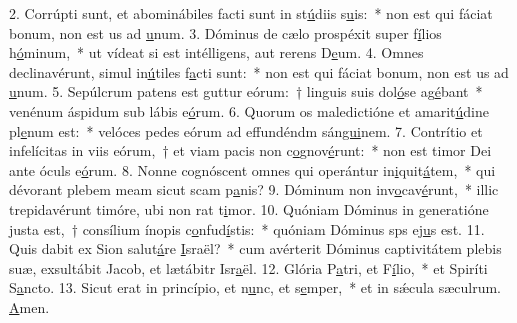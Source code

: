2. Corrúpti sunt, et abominábiles facti sunt in st\uline{ú}diis s\uline{u}is:~* non est qui fáciat bonum, non est us ad \uline{u}num.
3. Dóminus de cælo prospéxit super f\uline{í}lios h\uline{ó}minum,~* ut vídeat si est intélligens, aut rerens D\uline{e}um.
4. Omnes declinavérunt, simul in\uline{ú}tiles f\uline{a}cti sunt:~* non est qui fáciat bonum, non est us ad \uline{u}num.
5. Sepúlcrum patens est guttur eórum:~† linguis suis dol\uline{ó}se ag\uline{é}bant~* venénum áspidum sub lábis e\uline{ó}rum.
6. Quorum os maledictióne et amarit\uline{ú}dine pl\uline{e}num est:~* velóces pedes eórum ad effundéndm sán\uline{gui}nem.
7. Contrítio et infelícitas in viis eórum,~† et viam pacis non c\uline{o}gnov\uline{é}runt:~* non est timor Dei ante óculs e\uline{ó}rum.
8. Nonne cognóscent omnes qui operántur in\uline{i}quit\uline{á}tem,~* qui dévorant plebem meam sicut scam p\uline{a}nis?
9. Dóminum non inv\uline{o}cav\uline{é}runt,~* illic trepidavérunt timóre, ubi non rat t\uline{i}mor.
10. Quóniam Dóminus in generatióne justa est,~† consílium ínopis c\uline{o}nfud\uline{í}stis:~* quóniam Dóminus sps ej\uline{u}s est.
11. Quis dabit ex Sion salut\uline{á}re \uline{I}sraël?~* cum avérterit Dóminus captivitátem plebis suæ, exsultábit Jacob, et lætábitr Isr\uline{a}ël.
12. Glória P\uline{a}tri, et F\uline{í}lio,~* et Spiríti S\uline{a}ncto.
13. Sicut erat in princípio, et n\uline{u}nc, et s\uline{e}mper,~* et in sǽcula sæculrum. \uline{A}men.
